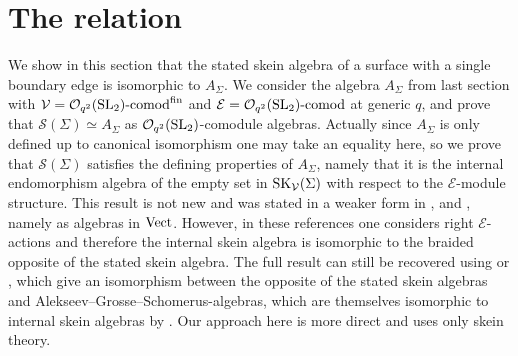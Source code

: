 \documentclass[pdftex]{sigma}%
\numberwithin{equation}{section}
\newcommand{\Oq}{\mathcal{O}_{q^2}({\rm SL}_2)}
\begin{document}
\section{The relation}\label{SectRelation}
We show in this section that the stated skein algebra of a surface with a single boundary edge is isomorphic to $A_\Sigma$. We consider the algebra $A_\Sigma$ from last section with $\mathcal{V} = \Oq\text{-}{\rm comod}^{\rm fin}$ and $\mathcal{E} = \Oq\text{-}{\rm comod}$ at generic $q$, and prove that $\mathscr{S}(\Sigma)\simeq A_\Sigma$ as $\Oq$-comodule algebras. Actually since $A_\Sigma$ is only defined up to canonical isomorphism one may take an equality here, so we prove that $\mathscr{S}(\Sigma)$ satisfies the defining properties of $A_\Sigma$, namely that it is the internal endomorphism algebra of the empty set in ${\rm SK}_\mathcal{V}(\Sigma)$ with respect to the $\mathcal{E}$-module structure. This result is not new and was stated in a weaker form in \cite[Theorem~4.4]{LeYu}, \cite[Theorem~9.1]{LeSikora} and \cite[Remark 2.21]{Gunningham}, namely as algebras in $\rm Vect$. However, in these references one considers right $\mathcal{E}$-actions and therefore the internal skein algebra is isomorphic to the braided opposite of the stated skein algebra. The full result can still be recovered using \cite[Theorem~5.3]{Faitg} or \cite{Korinman}, which give an isomorphism between the opposite of the stated skein algebras and Alekseev--Grosse--Schomerus-algebras, which are themselves isomorphic to internal skein algebras by \cite{BBJ}. Our approach here is more direct and uses only skein theory.
\end{document}
